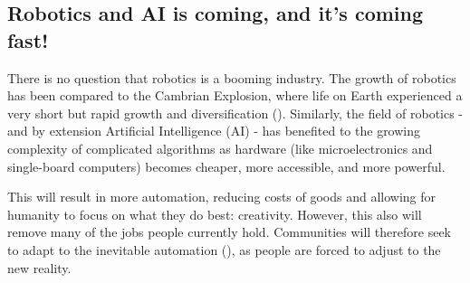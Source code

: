 \subsection{Robotics and AI is coming, and it's coming fast!}
There is no question that robotics is a booming industry.  The growth of robotics has been compared to the Cambrian Explosion, where life on Earth experienced a very short but rapid growth and diversification (\cite{Cambrian}). Similarly, the field of robotics - and by extension Artificial Intelligence (AI) - has benefited to the growing complexity of complicated algorithms as hardware (like microelectronics and single-board computers) becomes cheaper, more accessible, and more powerful. 

This will result in more automation, reducing costs of goods and allowing for humanity to focus on what they do best: creativity. However, this also will remove many of the jobs people currently hold. Communities will therefore seek to adapt to the inevitable automation (\cite{UnionsAutomation}), as people are forced to adjust to the new reality.